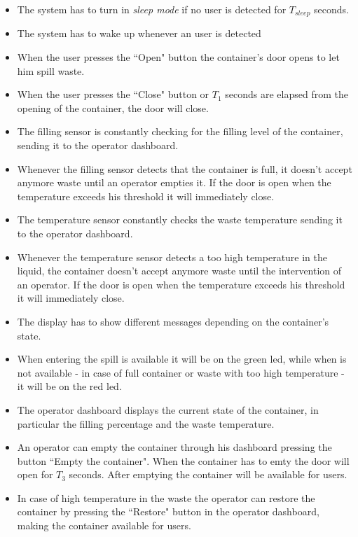 \documentclass[a4paper,12pt]{report}
\begin{document}
        \begin{itemize}
            \item The system has to turn in \textit{sleep mode} if no user is detected for $T_
            {sleep}$ seconds. 
            \item The system has to wake up whenever an user is detected
            \item When the user presses the ``Open" button the container's door opens to let him spill waste.
            \item When the user presses the ``Close" button or $T_1$ seconds are elapsed from the opening of the container, the door will close. 
            \item The filling sensor is constantly checking for the filling level of the container, sending it to the operator dashboard. 
            \item Whenever the filling sensor detects that the container is full, it doesn't accept anymore waste until an operator empties it. If the door is open when the temperature exceeds his threshold it will immediately close. 
            \item The temperature sensor constantly checks the waste temperature sending it to the operator dashboard. 
            \item Whenever the temperature sensor detects a too high temperature in the liquid, the container doesn't accept anymore waste until the intervention of an operator. If the door is open when the temperature exceeds his threshold it will immediately close. 
            \item The display has to show different messages depending on the container's state. 
            \item When entering the spill is available it will be on the green led, while when is not available - in case of full container or waste with too high temperature - it will be on the red led.  
            \item The operator dashboard displays the current state of the container, in particular the filling percentage and the waste temperature. 
            \item An operator can empty the container through his dashboard pressing the button ``Empty the container". When the container has to emty the door will open for $T_3$ seconds. After emptying the container will be available for users. 
            \item In case of high temperature in the waste the operator can restore the container by pressing the ``Restore" button in the operator dashboard, making the container available for users.  
        \end{itemize}
        
\end{document}
